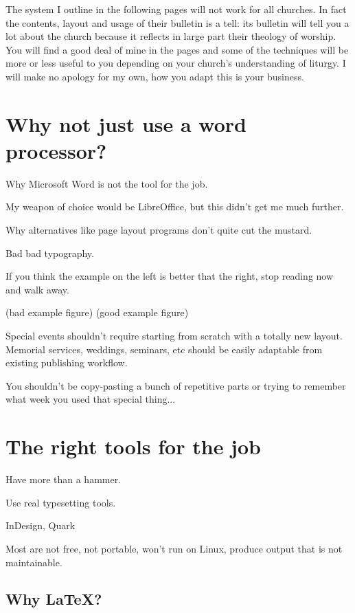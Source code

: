 \documentclass[12pt]{scrartcl}
\begin{document}
The system I outline in the following pages will not work for all churches. In
fact the contents, layout and usage of their bulletin is a tell: its bulletin
will tell you a lot about the church because it reflects in large part their
theology of worship. You will find a good deal of mine in the pages and some of
the techniques will be more or less useful to you depending on your church's
understanding of liturgy. I will make no apology for my own, how you adapt this
is your business.

\tableofcontents


\section{Why not just use a word processor?}

Why Microsoft Word is not the tool for the job.

My weapon of choice would be LibreOffice, but this didn't get me much further.

Why alternatives like page layout programs don't quite cut the mustard.

Bad bad typography.

If you think the example on the left is better that the right, stop reading now
and walk away.

(bad example figure) (good example figure)

Special events shouldn't require starting from scratch with a totally new
layout. Memorial services, weddings, seminars, etc should be easily adaptable
from existing publishing workflow.

You shouldn't be copy-pasting a bunch of repetitive parts or trying to remember
what week you used that special thing...

\section{The right tools for the job}

Have more than a hammer.

Use real typesetting tools.

InDesign, Quark

Most are not free, not portable, won't run on Linux, produce output that is not
maintainable.

\subsection{Why \LaTeX?}
\end{document}
